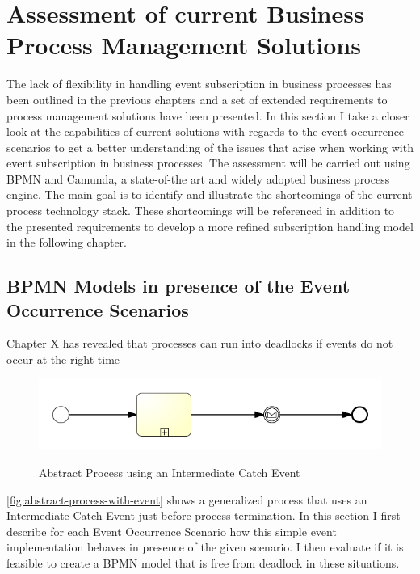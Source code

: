 \chapter{Assessment of current Business Process Management Solutions}\label{ch:assessment}

The lack of flexibility in handling event subscription in business processes has been outlined in the previous chapters and a set of extended requirements to process management solutions have been presented.
In this section I take a closer look at the capabilities of current solutions with regards to the event occurrence scenarios to get a better understanding of the issues that arise when working with event subscription in business processes.
The assessment will be carried out using BPMN and Camunda, a state-of-the art and widely adopted business process engine.
The main goal is to identify and illustrate the shortcomings of the current process technology stack. These shortcomings will be referenced in addition to the presented requirements to develop a more refined subscription handling model in the following chapter. 

\section{BPMN Models in presence of the Event Occurrence Scenarios}
Chapter X has revealed that processes can run into deadlocks if events do not occur at the right time 
\begin{figure}[]
	\myfloatalign
	{\includegraphics[width=1\linewidth]{chapters/assessment/process-with-intermediate-event.png}}
	\caption{Abstract Process using an Intermediate Catch Event}\label{fig:abstract-process-with-event}
\end{figure}

\autoref{fig:abstract-process-with-event} shows a generalized process that uses an Intermediate Catch Event just before process termination.
In this section I first describe for each Event Occurrence Scenario how this simple event implementation behaves in presence of the given scenario. I then evaluate if it is feasible to create a BPMN model that is free from deadlock in these situations. 

